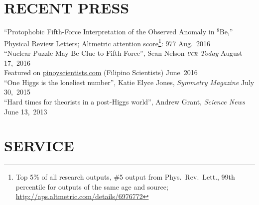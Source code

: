 \documentclass[margin,line]{resume}
\newcommand{\scap}[1]{\textsc{\MakeLowercase{#1}}}
\begin{document}
\begin{resume}

 

\section{\footnotesize \sc
\sffamily 
{}RECENT PRESS
}

``Protophobic Fifth-Force Interpretation of the Observed Anomaly in $^{8}$Be,''\\
	Physical Review Letters; 
	Altmetric attention score\footnote{Top 5\% of all research outputs, \#5 output from Phys.~Rev.~Lett., 99th percentile for outputs of the same age and source; \url{http://aps.altmetric.com/details/6976772}}: 977
	\hfill Aug.~2016\vspace{.7mm}\\   
``Nuclear Puzzle May Be Clue to Fifth Force'', Sean Nelson \emph{\scap{UCR} Today}
\hfill August 17,~2016\vspace{.7mm}\\   
%
Featured on \url{pinoyscientists.com} (Filipino Scientists)
\hfill June~2016\vspace{.7mm}\\   
%
%
``One Higgs is the loneliest number'', Katie Elyce Jones, \emph{Symmetry Magazine}
\hfill July 30,~2015\vspace{.7mm}\\   
%
``Hard times for theorists in a post-Higgs world'', Andrew Grant, \emph{Science News}
\hfill June 13,~2013\vspace{.7mm}%






\section{\footnotesize \sc
\sffamily 
{}SERVICE
}




\end{resume}
\end{document}
